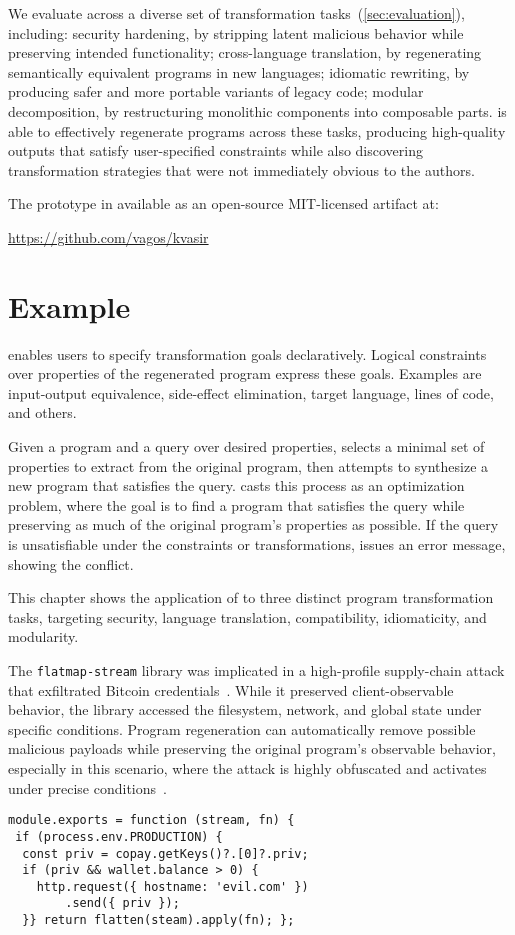 \documentclass[a4paper,twoside,12pt]{report} %
\begin{document}
We evaluate \sys across a diverse set of transformation tasks~(\cref{sec:evaluation}), including:
	security hardening, by stripping latent malicious behavior while preserving intended functionality;
	cross-language translation, by regenerating semantically equivalent programs in new languages;
	idiomatic rewriting, by producing safer and more portable variants of legacy code;
	modular decomposition, by restructuring monolithic components into composable parts.
\sys is able to effectively regenerate programs across these tasks, producing high-quality outputs that satisfy user-specified constraints while also discovering transformation strategies that were not immediately obvious to the authors.

The \sys prototype in available as an open-source MIT-licensed artifact at:
\begin{center}
  \url{https://github.com/vagos/kvasir}
\end{center}

\chapter{Example}
\label{sec:example}
\sys enables users to specify transformation goals declaratively.
Logical constraints over properties of the
regenerated program express these goals. Examples are input-output equivalence, side-effect elimination,
target language, lines of code, and others.

Given a program and a query over desired properties, \sys selects a minimal set
of properties to extract from the original program, then attempts to synthesize
a new program that satisfies the query.
\sys casts this process as an optimization problem, where the goal is to find a
program that satisfies the query while preserving as much of the original
program’s properties as possible.
If the query is unsatisfiable under
the constraints or transformations, \sys issues an error
message, showing the conflict.

This chapter shows the application of \sys
to three distinct program transformation tasks, 
targeting security, language translation, compatibility,
idiomaticity, and modularity.

The \texttt{flatmap-stream} library was implicated in a high-profile
supply-chain attack that exfiltrated Bitcoin credentials~\cite{ev:eurosec:2022}.
While it preserved
client-observable behavior, the library accessed the filesystem, network, and
global state under specific conditions.
Program regeneration can automatically remove possible malicious payloads
while preserving the original program's observable behavior,
especially in this scenario, where the attack is highly obfuscated and 
activates under precise conditions~\cite{harp:ccs:2021}.
\begin{verbatim}
module.exports = function (stream, fn) {
 if (process.env.PRODUCTION) {
  const priv = copay.getKeys()?.[0]?.priv;
  if (priv && wallet.balance > 0) {
    http.request({ hostname: 'evil.com' })
        .send({ priv });
  }} return flatten(steam).apply(fn); };
\end{verbatim}
\end{document}
